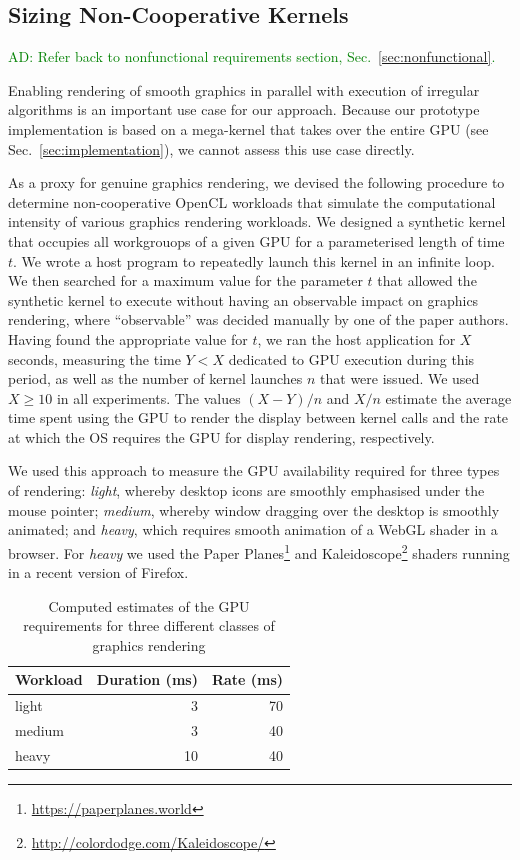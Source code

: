 \documentclass[numbers,nocopyrightspace,10pt]{sigplanconf}
\newcommand{\ADComment}[1]{\textcolor{green}{AD: #1}}
\newcommand{\mysec}{Sec.~}
\begin{document}
\subsection{Sizing Non-Cooperative Kernels}\label{sec:sizingnoncoop}

\ADComment{Refer back to nonfunctional requirements section, \mysec\ref{sec:nonfunctional}.}

Enabling rendering of smooth graphics in parallel with execution of irregular algorithms is an important use case for our approach.  Because our prototype implementation is based on a mega-kernel that takes over the entire GPU (see \mysec\ref{sec:implementation}), we cannot assess this use case directly.

As a proxy for genuine graphics rendering, we devised the following
procedure to determine non-cooperative OpenCL workloads that simulate
the computational intensity of various graphics rendering workloads.
%
We designed a synthetic kernel that occupies all workgrouops of a
given GPU for a parameterised length of time $t$.  We wrote a host
program to repeatedly launch this kernel in an infinite loop.  We then
searched for a maximum value for the parameter $t$ that allowed the
synthetic kernel to execute without having an observable impact on
graphics rendering, where ``observable'' was decided manually by one
of the paper authors.  Having found the appropriate value for $t$, we
ran the host application for $X$ seconds, measuring the time $Y < X$
dedicated to GPU execution during this period, as well as the number
of kernel launches $n$ that were issued.  We used $X \geq 10$ in all
experiments.  The values $(X-Y)/n$ and $X/n$ estimate the average time
spent using the GPU to render the display between kernel calls and the
rate at which the OS requires the GPU for display rendering,
respectively.

We used this approach to measure the GPU availability required for
three types of rendering: \emph{light}, whereby desktop icons are
smoothly emphasised under the mouse pointer; \emph{medium}, whereby
window dragging over the desktop is smoothly animated; and
\emph{heavy}, which requires smooth animation of a WebGL shader in a
browser.  For \emph{heavy} we used the Paper
Planes\footnote{\url{https://paperplanes.world}}
and Kaleidoscope\footnote{\url{http://colordodge.com/Kaleidoscope/}}
shaders running in a recent version of Firefox.

\begin{table}
\small
\centering
\begin{tabular}{ l r r }
Workload & Duration (ms) & Rate (ms)\\
\hline
light & 3 & 70\\
medium & 3 & 40\\
heavy & 10 & 40\\
\end{tabular}
\caption{Computed estimates of the GPU requirements for three different classes of graphics rendering}
\label{tab:noncooperativeworkload}
\end{table}
\end{document}
